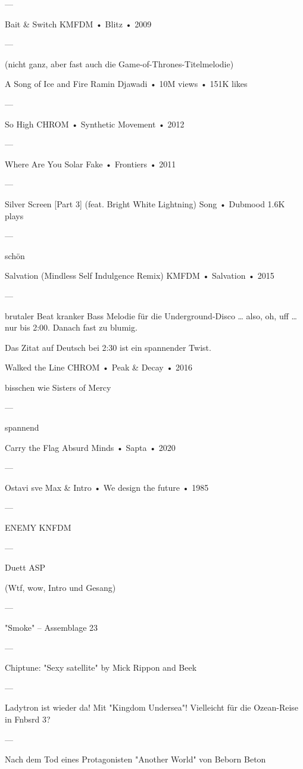 —

Bait & Switch
KMFDM
 •
Blitz
 •
2009

—

(nicht ganz, aber fast auch die Game-of-Thrones-Titelmelodie)

A Song of Ice and Fire
Ramin Djawadi
 •
10M views
 •
151K likes

—

So High
CHROM
 •
Synthetic Movement
 •
2012

—

Where Are You
Solar Fake
 •
Frontiers
 •
2011

—

Silver Screen [Part 3] (feat. Bright White Lightning)
Song
 •
Dubmood
1.6K plays

—

schön

Salvation (Mindless Self Indulgence Remix)
KMFDM
 •
Salvation
 •
2015

—

brutaler Beat
kranker Bass
Melodie für die Underground-Disco … also, oh, uff … nur bis 2:00. Danach fast zu blumig.

Das Zitat auf Deutsch bei 2:30 ist ein spannender Twist.

Walked the Line
CHROM
 •
Peak & Decay
 •
2016

bisschen wie Sisters of Mercy


—

spannend

Carry the Flag
Absurd Minds
 •
Sapta
 •
2020

—

Ostavi sve
Max & Intro
 •
We design the future
 •
1985

—

ENEMY
KNFDM

—

Duett
ASP

(Wtf, wow, Intro und Gesang)

—

"Smoke" – Assemblage 23

—

Chiptune:
"Sexy satellite" by Mick Rippon and Beek

—

Ladytron ist wieder da!
Mit "Kingdom Undersea"! Vielleicht für die Ozean-Reise in Fnbsrd 3?

—

Nach dem Tod eines Protagonisten
"Another World" von Beborn Beton

